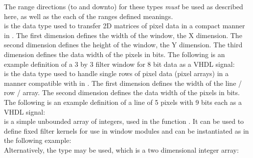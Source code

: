 The range directions (to and downto) for these types \emph{must} be used as described here, as well as the each of the ranges defined meanings.\\

 is the data type used to transfer 2D matrices of pixel data in a compact manner in \asterics.
The first dimension defines the width of the window, the X dimension.
The second dimension defines the height of the window, the Y dimension.
The third dimension defines the data width of the pixels in bits.
The following is an example definition of a 3 by 3 filter window for 8 bit data as a VHDL signal:
\\

 is the data type used to handle single rows of pixel data (pixel arrays) in a manner compatible with  in \asterics.
The first dimension defines the width of the line / row / array.
The second dimension defines the data width of the pixels in bits.
The following is an example definition of a line of 5 pixels with 9 bits each as a VHDL signal:
\\

 is a simple unbounded array of integers, used in the function .
It can be used to define fixed filter kernels for use in window modules and can be instantiated as in the following example:
\\
Alternatively, the type  may be used, which is a two dimensional integer array:\\



